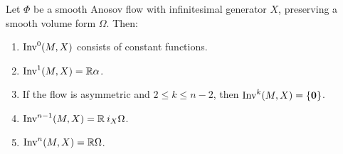 \documentclass[10pt,a4paper]{amsart}
\newcommand{\R}{\mathbb{R}}                     %
\begin{document}
\begin{prop}   \label{prop:invariant}
  Let $\Phi$ be a smooth Anosov flow with infinitesimal generator
  $X$, preserving a smooth volume form $\Omega$. Then:

  \begin{enumerate}
  \item[(a)] $\text{\normalfont Inv}^0(M,X)$ consists of constant functions.
  \item[(b)] $\text{\normalfont Inv}^1(M,X) = \R \alpha$.
  \item[(c)] If the flow is asymmetric and $2 \leq k \leq n-2$, then
    $\text{\normalfont Inv}^k(M,X) = \{ \mathbf{0} \}$.
  \item[(d)] $\text{\normalfont Inv}^{n-1}(M,X) = \R \: i_X \Omega$.
  \item[(e)] $\text{\normalfont Inv}^n(M,X) = \R \Omega$.
  \end{enumerate}
  
\end{prop}
\end{document}
